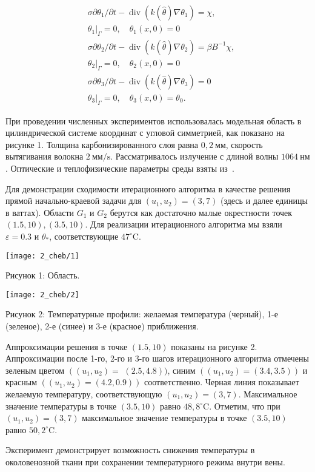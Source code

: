 \[
    \begin{aligned}
        &\sigma \partial \theta_{1} / \partial t-\operatorname{div}\left(k(\widehat{\theta})
        \nabla \theta_{1}\right)=\chi, \\
        &\left.\theta_{1}\right|_{\Gamma}=0, \quad \theta_{1}(x, 0)=0 \\
        &\sigma \partial \theta_{2} / \partial t-\operatorname{div}\left(k(\widehat{\theta})
        \nabla \theta_{2}\right)=\beta B^{-1} \chi, \\
        &\left.\theta_{2}\right|_{\Gamma}=0, \quad \theta_{2}(x, 0)=0 \\
        &\sigma \partial \theta_{3} / \partial t-\operatorname{div}\left(k(\widehat{\theta})
        \nabla \theta_{3}\right)=0 \\
        &\left.\theta_{3}\right|_{\Gamma}=0, \quad \theta_{3}(x, 0)=\theta_{0}.
    \end{aligned}
\]

При проведении численных экспериментов использовалась модельная область в
цилиндрической системе координат с угловой симметрией, как показано на рисунке 1.
Толщина карбонизированного слоя равна $0,2 \mathrm{~мм}$,
скорость вытягивания волокна $2 \mathrm{~мм}/\mathrm{s}$.
Рассматривалось излучение с длиной волны $1064 \mathrm{~нм}$.
Оптические и теплофизические параметры среды взяты
из~\cite{Opticalthermal_vanRuijven2014, Some_Poluektova2014, Endovenous_Malskat2014}.


Для демонстрации сходимости итерационного алгоритма в качестве
решения прямой начально-краевой задачи для $\left(u_{1}, u_{2}\right)=( 3,7)$
(здесь и далее единицы в ваттах).
Области $G_{1}$ и $G_{2}$ берутся как достаточно малые окрестности
точек $(1.5,10),(3.5,10)$.
Для реализации итерационного алгоритма мы взяли $\varepsilon=0.3$ и $\theta_{*}$,
соответствующие $47^{\circ} \mathrm{C}$.


\texttt{[image: 2\_cheb/1]}

Рисунок 1: Область.

\texttt{[image: 2\_cheb/2]}

Рисунок 2: Температурные профили: желаемая температура (черный),
1-е (зеленое), 2-е (синее) и 3-е (красное) приближения.

Аппроксимации решения в точке $(1.5,10)$ показаны на рисунке 2.
Аппроксимации после 1-го, 2-го и 3-го шагов итерационного
алгоритма отмечены зеленым цветом
$\left(\left(u_{1 }, u_{2}\right)=\right.$ $(2.5,4.8))$,
синим  $\left(\left(u_{1}, u_{2}\right)=(3.4,3.5)\right)$
и красным $\left(\left(u_{1}, u_{2}\right)=(4.2,0.9)\right)$ соответственно.
Черная линия показывает желаемую температуру, соответствующую
$\left(u_{1}, u_{2}\right)=(3,7)$.
Максимальное значение температуры в точке $(3.5,10)$ равно $48,8^{\circ}\mathrm{C}$.
Отметим, что при $\left(u_{1}, u_{2}\right)=(3,7)$ максимальное значение
температуры в точке $(3.5,10)$ равно $50,2^{ \circ} \mathrm{C}$.

Эксперимент демонстрирует возможность снижения температуры в
околовенозной ткани при сохранении температурного режима внутри вены.
